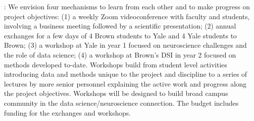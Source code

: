 : We envision four mechanisms to learn from
each other and to make progress on project objectives: (1) a weekly
Zoom videoconference with faculty and students, involving a business
meeting followed by a scientific presentation; (2) annual exchanges
for a few days of 4 Brown students to Yale and 4 Yale students to
Brown; 
(3) a workshop at Yale in year 1 focused on neuroscience challenges and the role of data science; (4) a workshop at Brown's DSI in year 2 focused on methods developed to-date. Workshops build from student level activities introducing data and
methods unique to the project and discipline to a series of lectures by more senior personnel explaining the active work and progress along the project objectives. Workshops will be designed to build broad campus community in the data science/neuroscience connection. The budget includes funding for the exchanges and workshops.



